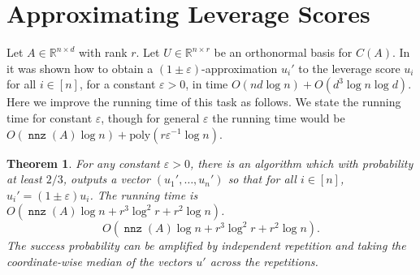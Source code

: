 \documentclass{sig-alternate}
\DeclareMathOperator{\nnz}{\mathtt{nnz}}
\newcommand{\poly}{{\mathrm{poly}}}
\newcommand{\eps}{\varepsilon}
\newtheorem{theorem}{Theorem}
\begin{document}
\section{Approximating Leverage Scores}\label{sec:leverage}
\fi
Let $A \in \mathbb{R}^{n \times d}$ with rank $r$. Let $U \in \mathbb{R}^{n \times r}$ be an
orthonormal basis for $C(A)$. In \cite{dmmw11} it was shown how to obtain 
a $(1 \pm \eps)$-approximation $u_i'$ to the leverage score $u_i$ for all $i \in [n]$, for a constant $\eps > 0$,
in time $O(nd \log n) + O(d^3 \log n \log d)$. Here we improve the running time of this task as
follows. We state the running time for constant $\eps$, though for general $\eps$ the running time
would be $O(\nnz(A)\log n) + \poly(r\eps^{-1} \log n)$. 
\begin{theorem}\label{thm:icml}
For any constant $\eps > 0$, there is an algorithm which with probability at least $2/3$, outputs
a vector $(u_1', \ldots, u_n')$ so that for all $i \in [n]$, $u_i' = (1 \pm \eps)u_i$. The running time
is \ifSTOC
$O(\nnz(A) \log n + r^3 \log^2 r + r^2 \log n)$.
\else
$$O(\nnz(A) \log n + r^3 \log^2 r + r^2 \log n).$$
\fi
The success probability can be amplified by independent repetition and taking the coordinate-wise
median of the vectors $u'$ across the repetitions. 
\end{theorem}
\end{document}
